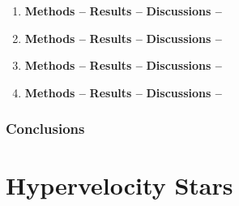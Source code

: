 \documentclass[a4paper]{article}
\begin{document}
		\begin{enumerate} [label*=\textbf{(\alph*)}]
			
			
			\item
				\subitem \textbf{Methods  --}
				\subitem \textbf{Results  --}
				\subitem \textbf{Discussions  --}
				
			
			\item
				\subitem \textbf{Methods  --}
				\subitem \textbf{Results  --}
				\subitem \textbf{Discussions  --}
			
			
			\item
				\subitem \textbf{Methods  --}
				\subitem \textbf{Results  --}
				\subitem \textbf{Discussions  --}
			
			
			\item
				\subitem \textbf{Methods  --}
				\subitem \textbf{Results  --}
				\subitem \textbf{Discussions  --}
			
		\end{enumerate}
		
		
		



		\section{Conclusions} \label{2:conclusions}


	
	\clearpage
	\setcounter{section}{0}
	\part{Hypervelocity Stars} \label{Problem3}
\end{document}
